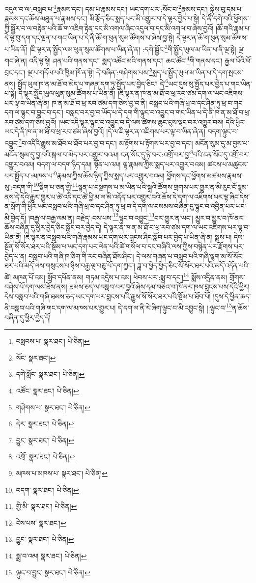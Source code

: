 འདུལ་བ་ལ་:བསླབ་པ་\footnote{བསླབས་པ་  སྣར་ཐང་།  པེ་ཅིན། }རྣམས་དང་། དམ་པ་རྣམས་དང་། ཡང་དག་པར་:སོང་བ་\footnote{སོང་  སྣར་ཐང་། }རྣམས་དང་། སྐྱེས་བུ་དམ་པ་རྣམས་དང་ཆོས་མཐུན་པ་རྣམས་དང་། མི་རྩོད་ཅིང་སྨད་པར་མི་འགྱུར་བ་དེ་ལྟར་བྱེད་པ་སྟེ། དེ་ནི་དགེ་བའི་ཕྱོགས་ཀྱི་སྦྱོར་བ་ལ་བརྟེན་པའི་ཆོ་ག་འཇིག་རྟེན་དང་མི་འགལ་ཞིང་འདུལ་བ་དང་མི་འགལ་བ་ཞེས་བྱའོ། །ཆོ་གའི་རྣམ་པ་དེ་ལྟ་བུ་དག་དང་ལྡན་པ་གང་ཡིན་པ་དེ་ནི་ཆོ་ག་ཕུན་སུམ་ཚོགས་པ་ཞེས་བྱ་སྟེ། དེ་ལྟར་ན་ཆོ་ག་ཕུན་སུམ་ཚོགས་པ་ཡིན་ནོ། །ཇི་ལྟར་ན་སྤྱོད་ལམ་ཕུན་སུམ་ཚོགས་པ་ཡིན་ཞེ་ན། :དགེ་སྦྱོང་\footnote{དགེ་སློང་  སྣར་ཐང་།  པེ་ཅིན། }གི་སྤྱོད་ཡུལ་མ་ཡིན་པ་ནི་ལྔ་སྟེ། ལྔ་གང་ཞེ་ན། འདི་ལྟ་སྟེ། ཤན་པའི་གནས་དང་། སྨད་འཚོང་མའི་གནས་དང་། ཆང་ཚོང་\footnote{འཚོང་  སྣར་ཐང་།  པེ་ཅིན། }གི་གནས་དང་། རྒྱལ་པོའི་ཕོ་བྲང་དང་། ལྔ་པ་གདོལ་པའི་ཁྱིམ་ཁོ་ན་སྟེ། དེ་བཞིན་:གཤེགས་པས་\footnote{གཤེགས་པ་  སྣར་ཐང་།  པེ་ཅིན། }སྨད་པ་སྤྱོད་ཡུལ་མ་ཡིན་པ་དེ་དག་སྤངས་ནས། སྤྱོད་ཡུལ་ཁ་ན་མ་ཐོ་བ་མེད་པ་གཞན་དག་ཏུ་སྤྱོད་པར་བྱེད་ཅིང་། དེ་\footnote{དེར་  སྣར་ཐང་།  པེ་ཅིན། }ཡང་དུས་སུ་སྤྱོད་པར་བྱེད་པ་གང་ཡིན་པ་སྟེ། དེ་ལྟར་སྤྱོད་ཡུལ་ཕུན་སུམ་ཚོགས་པ་ཡིན་ནོ། །ཇི་ལྟར་ན་ཁ་ན་མ་ཐོ་བ་ཕྲ་རབ་ཙམ་དག་ལ་ཡང་འཇིགས་པར་ལྟ་བ་ཡིན་ཞེ་ན། ཁ་ན་མ་ཐོ་བ་ཕྲ་རབ་ཙམ་དག་ཅེས་བྱ་བ་ནི། བསླབ་པའི་གཞི་ཕྲ་བ་དང་ཤིན་ཏུ་ཕྲ་བ་གང་དག་ལ་ལྟུང་བ་བྱུང་བ་དང་། བསླང་བར་བྱ་བ་ཡོད་པ་དེ་དག་གི་ལྟུང་བ་འབྱུང་བ་གང་ཡིན་པ་དེ་ནི་ཁ་ན་མ་ཐོ་བ་ཕྲ་རབ་ཙམ་དག་ཅེས་བྱའོ། །ཡང་འདི་ལྟར་ལྟུང་བ་འབྱུང་བ་དེ་ལས་ཚེགས་ཆུང་ངུས་ལྡང་བར་འགྱུར་བས། དེའི་ཕྱིར་ཡང་དེ་ནི་ཁ་ན་མ་ཐོ་བ་ཕྲ་རབ་ཙམ་ཞེས་བྱའོ། །དེ་ལ་ཇི་ལྟར་ན་འཇིགས་པར་ལྟ་བ་ཡིན་ཞེ་ན། བདག་ལྟུང་བ་འབྱུང་\footnote{བྱུང་  སྣར་ཐང་།  པེ་ཅིན། }བ་འདིའི་རྒྱུས་མ་ཐོབ་པ་ཐོབ་པར་བྱ་བ་དང་། མ་རྟོགས་པ་རྟོགས་པར་བྱ་བ་དང་། མངོན་སུམ་དུ་མ་བྱས་པ་མངོན་སུམ་དུ་བྱ་བའི་སྐལ་བ་མེད་པར་འགྱུར་བའམ། ངན་སོང་དུ་ཉེ་བར་:འགྲོ་བར་བྱ་\footnote{འགྲོ་  སྣར་ཐང་།  པེ་ཅིན། }བའི་ངན་སོང་དུ་འགྲོ་བར་འགྱུར་བའམ། བདག་ལ་བདག་ཉིད་དམ། སྟོན་པ་འམ། ལྷ་རྣམས་ཀྱིས་སྨད་པར་འགྱུར་བའམ། ཚངས་པ་མཚུངས་པར་སྤྱོད་པ་:མཁས་པ་\footnote{མཁས་པ་མཁས་པ་  སྣར་ཐང་།  པེ་ཅིན། }རྣམས་ཀྱིས་ཆོས་ཉིད་ཀྱིས་སྨད་པར་འགྱུར་བའམ། ཕྱོགས་དང་ཕྱོགས་མཚམས་རྣམས་སུ་:བདག་གི་\footnote{བདག་  སྣར་ཐང་།  པེ་ཅིན། }སྡིག་པ་ཅན་གྱི་\footnote{གྱི་མི་  སྣར་ཐང་།  པེ་ཅིན། }སྙན་པ་བསྔགས་པ་མ་ཡིན་པའི་སྒྲའི་ཚོགས་གྲགས་པར་གྱུར་ན་མི་རུང་ངོ་སྙམ་ནས་དེ་དེའི་རྒྱུར་གྱུར་པ་ཚེ་འདི་དང་ཚེ་ཕྱི་མ་ལ་མི་འདོད་པར་འགྱུར་བའི་ཆོས་དེ་དག་ལ་འཇིགས་པར་ལྟ་ཞིང་དེས་ན་སྲོག་གི་ཕྱིར་ཡང་བསླབ་པའི་གཞི་ཕྲ་བ་དང་ཤིན་ཏུ་ཕྲ་བ་དེ་དག་ལ་བསམས་བཞིན་དུ་ལྟུང་བ་འབྱིན་པར་ཡང་མི་བྱེད་དོ། །བརྒྱ་ལ་བརྒྱ་ལམ་ན། བརྗེད་:ངས་པས་\footnote{ངེས་པས་  སྣར་ཐང་། }ལྟུང་བ་འབྱུང་\footnote{བྱུང་  སྣར་ཐང་།  པེ་ཅིན། }བར་གྱུར་ན་ཡང་། མྱུར་བ་མྱུར་བ་ཁོ་ནར་ཆོས་བཞིན་དུ་ཕྱིར་བྱེད་ཅིང་སློང་བར་བྱེད་དེ། དེ་ལྟར་ན་ཁ་ན་མ་ཐོ་བ་ཕྲ་རབ་ཙམ་དག་ལ་ཡང་འཇིགས་པར་ལྟ་བ་ཡིན་ནོ། །ཇི་ལྟར་ན་བསླབ་པའི་གཞི་རྣམས་ཡང་དག་པར་བླངས་ཤིང་སློབ་པར་བྱེད་པ་ཡིན་ཞེ་ན། སྨྲས་པ། དེས་སྔོན་སོ་སོར་ཐར་པའི་སྡོམ་པ་ཡང་དག་པར་ལེན་པའི་ཚེ་གསོལ་བ་དང་བཞིའི་ལས་ཀྱིས་བསྙེན་པར་རྫོགས་པར་བྱེད་པ་ན། བསླབ་པའི་གཞི་ཁ་ཅིག་གི་རང་བཞིན་ཐོས་ཤིང་། དེ་ལས་གཞན་པ་བསླབ་པའི་གཞི་ལྷག་མ་སོ་སོར་ཐར་པའི་མདོ་ལས་གསུངས་པ་ཉིས་བརྒྱ་ལྔ་བཅུ་པོ་དག་ཀྱང་། ཟླ་བ་ཕྱེད་ཕྱེད་ཅིང་སོ་སོར་ཐར་པའི་མདོ་འདོན་པའི་ཚེ། མཁན་པོ་འམ། སློབ་དཔོན་ནམ། གཏམ་འདྲེས་པ་འམ། ཕེབས་པར་:སྨྲ་བ་དང་།\footnote{སྨྲ་བ་འམ།  སྣར་ཐང་།  པེ་ཅིན། } སྨོས་འདྲིན་ནམ། གྲོགས་བཤེས་པོ་དག་ལས་ཐོས་ནས། ཐམས་ཅད་ལ་བསླབ་པར་བྱའོ་ཞེས་དམ་བཅའ་བ་ཁོ་ནར་ཁས་བླངས་པས་དེའི་ཕྱིར། དེས་བསླབ་པའི་གཞི་ཐམས་ཅད་ཡང་དག་པར་བླངས་པའི་རྒྱུས་སོ་སོར་ཐར་པའི་སྡོམ་པ་ཐོབ་པོ། །དུས་དེ་ཕྱིན་ཆད་ནི་བསླབ་པའི་གཞི་གང་དག་ལ་མཁས་པར་གྱུར་པ། དེ་དག་ལ་ནི་རེ་ཞིག་ལྟུང་བ་མི་འབྱུང་སྟེ། །:ལྟུང་བ་\footnote{ལྟུང་བ་བྱུང་  སྣར་ཐང་།  པེ་ཅིན། }ན་ཆོས་བཞིན་དུ་ཕྱིར་བྱེད་དོ། 
